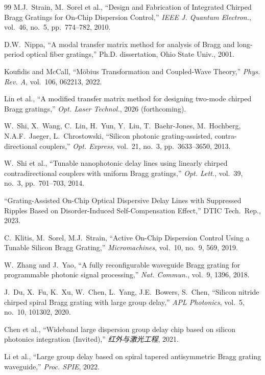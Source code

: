 \documentclass[12pt,a4paper,twoside]{article}
\begin{document}
\begin{thebibliography}{99}
M.J.~Strain, M.~Sorel et al.,
``Design and Fabrication of Integrated Chirped Bragg Gratings for On-Chip Dispersion Control,''
\textit{IEEE J. Quantum Electron.}, vol.~46, no.~5, pp.~774--782, 2010.

D.W.~Nippa,
``A modal transfer matrix method for analysis of Bragg and long-period optical fiber gratings,''
Ph.D. dissertation, Ohio State Univ., 2001.

Koufidis and McCall,
``M\"{o}bius Transformation and Coupled-Wave Theory,''
\textit{Phys. Rev. A}, vol.~106, 062213, 2022.

Lin et al.,
``A modified transfer matrix method for designing two-mode chirped Bragg gratings,''
\textit{Opt. Laser Technol.}, 2026 (forthcoming).

W.~Shi, X.~Wang, C.~Lin, H.~Yun, Y.~Liu, T.~Baehr-Jones,
M.~Hochberg, N.A.F.~Jaeger, L.~Chrostowski,
``Silicon photonic grating-assisted, contra-directional couplers,''
\textit{Opt. Express}, vol.~21, no.~3, pp.~3633--3650, 2013.

W.~Shi et al.,
``Tunable nanophotonic delay lines using linearly chirped contradirectional couplers
with uniform Bragg gratings,''
\textit{Opt. Lett.}, vol.~39, no.~3, pp.~701--703, 2014.

``Grating-Assisted On-Chip Optical Dispersive Delay Lines with Suppressed Ripples
Based on Disorder-Induced Self-Compensation Effect,''
DTIC Tech.~Rep., 2023.

C.~Klitis, M.~Sorel, M.J.~Strain,
``Active On-Chip Dispersion Control Using a Tunable Silicon Bragg Grating,''
\textit{Micromachines}, vol.~10, no.~9, 569, 2019.

W.~Zhang and J.~Yao,
``A fully reconfigurable waveguide Bragg grating for programmable photonic signal processing,''
\textit{Nat. Commun.}, vol.~9, 1396, 2018.

J.~Du, X.~Fu, K.~Xu, W.~Chen, L.~Yang, J.E.~Bowers, S.~Chen,
``Silicon nitride chirped spiral Bragg grating with large group delay,''
\textit{APL Photonics}, vol.~5, no.~10, 101302, 2020.

Chen et al.,
``Wideband large dispersion group delay chip based on silicon photonics integration (Invited),''
\textit{红外与激光工程}, 2021.

Li et al.,
``Large group delay based on spiral tapered antisymmetric Bragg grating waveguide,''
\textit{Proc. SPIE}, 2022.


\end{thebibliography}
\end{document}
